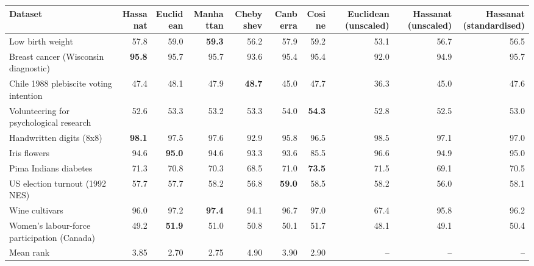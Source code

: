 \begin{tabular}{lrrrrrrrrr}
\toprule
Dataset & Hassanat & Euclidean & Manhattan & Chebyshev & Canberra & Cosine & Euclidean (unscaled) & Hassanat (unscaled) & Hassanat (standardised) \\
\midrule
Low birth weight & 57.8 & 59.0 & \textbf{59.3} & 56.2 & 57.9 & 59.2 & 53.1 & 56.7 & 56.5 \\
Breast cancer (Wisconsin diagnostic) & \textbf{95.8} & 95.7 & 95.7 & 93.6 & 95.4 & 95.4 & 92.0 & 94.9 & 95.7 \\
Chile 1988 plebiscite voting intention & 47.4 & 48.1 & 47.9 & \textbf{48.7} & 45.0 & 47.7 & 36.3 & 45.0 & 47.6 \\
Volunteering for psychological research & 52.6 & 53.3 & 53.2 & 53.3 & 54.0 & \textbf{54.3} & 52.8 & 52.5 & 53.0 \\
Handwritten digits (8x8) & \textbf{98.1} & 97.5 & 97.6 & 92.9 & 95.8 & 96.5 & 98.5 & 97.1 & 97.0 \\
Iris flowers & 94.6 & \textbf{95.0} & 94.6 & 93.3 & 93.6 & 85.5 & 96.6 & 94.9 & 95.0 \\
Pima Indians diabetes & 71.3 & 70.8 & 70.3 & 68.5 & 71.0 & \textbf{73.5} & 71.5 & 69.1 & 70.5 \\
US election turnout (1992 NES) & 57.7 & 57.7 & 58.2 & 56.8 & \textbf{59.0} & 58.5 & 58.2 & 56.0 & 58.1 \\
Wine cultivars & 96.0 & 97.2 & \textbf{97.4} & 94.1 & 96.7 & 97.0 & 67.4 & 95.8 & 96.2 \\
Women's labour-force participation (Canada) & 49.2 & \textbf{51.9} & 51.0 & 50.8 & 50.1 & 51.7 & 48.1 & 49.1 & 50.4 \\
\midrule
Mean rank & 3.85 & 2.70 & 2.75 & 4.90 & 3.90 & 2.90 & -- & -- & -- \\
\bottomrule
\end{tabular}
